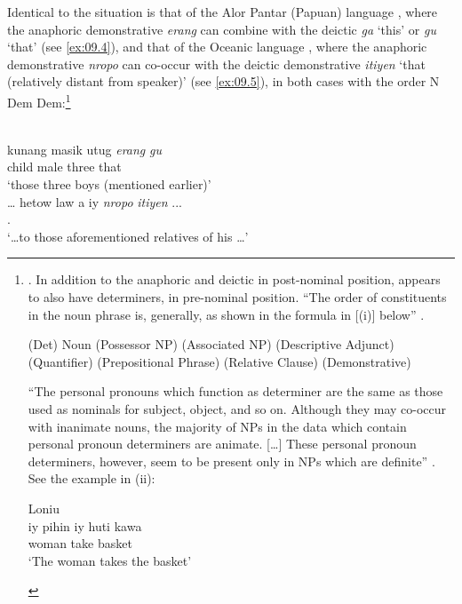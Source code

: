 \documentclass[output=paper]{langsci/langscibook}
\begin{document}
Identical to the  situation is that of the Alor Pantar (Papuan)
language , where the anaphoric demonstrative \emph{erang}
can combine with the deictic  \emph{ga} ‘this’ or \emph{gu}
‘that’ \parencite[§4]{Klamer2014} (see \ref{ex:09.4}), and that of the Oceanic language
 \parencite[§4.3.7]{Hamel1994}, where the anaphoric
demonstrative \emph{nropo} can co-occur with the deictic demonstrative
\emph{itiyen} `that (relatively distant from speaker)' (see \ref{ex:09.5}), in both cases
with the order N Dem Dem:\footnote{
    \parencite[99]{Hamel1994}.  In addition to the anaphoric and deictic
     in post-nominal position,  appears to also have
    determiners, in pre-nominal position.  \enquote{The order of constituents
        in the noun phrase is, generally, as shown in the formula in [(i)]
    below} \parencite[89]{Hamel1994}.

\begin{exe}
    (Det) Noun (Possessor NP) (Associated NP) (Descriptive Adjunct)
    (Quantifier) (Prepositional Phrase) (Relative Clause) (Demonstrative)
\end{exe}

\enquote{The personal pronouns which function as determiner are the same as
    those used as nominals for subject, object, and so on. Although they may
    co-occur with inanimate nouns, the majority of NPs in the data which
    contain personal pronoun determiners are animate. [\dots] These
personal pronoun determiners, however, seem to be present only in NPs which are
definite} \parencite[90]{Hamel1994}. See the example in (ii):

\begin{exe}
     Loniu\\
	\gll iy   pihin      iy    huti kawa\\
		\Tsg{} woman \Tsg{} take basket\\
	\glt ‘The woman takes the basket’
\end{exe}\label{fn:9.5}}

\ea {} \parencite[120]{Klamer2014}\label{ex:09.4}\\
	\gll kunang   masik     utug \textit{erang} \textit{gu} \\
        child  male three {\Dem{}} {that}\\
	\glt ‘those three boys (mentioned earlier)’
\ex {} \parencite[99]{Hamel1994}\label{ex:09.5}\\
    \gll \dots{} hetow    law        a  iy  \textit{nropo} \textit{itiyen} ... \\
		{} \Tpl.\Cl{} \Rel{} \Poss{} \Tsg{} {\Dem{}} {\Dem{}} {}\\
	\glt ‘\dots  to those aforementioned relatives of his \dots’
\z\largerpage
\end{document}
